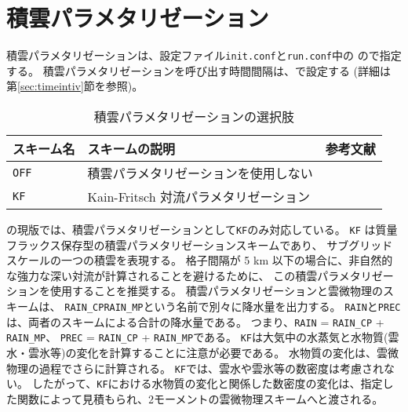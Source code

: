 \section{積雲パラメタリゼーション} \label{sec:basic_usel_cumulus}

積雲パラメタリゼーションは、設定ファイル\verb|init.conf|と\verb|run.conf|中の
ので指定する。
積雲パラメタリゼーションを呼び出す時間間隔は、で設定する
(詳細は第\ref{sec:timeintiv}節を参照)。

\begin{table}[h]
\begin{center}
  \caption{積雲パラメタリゼーションの選択肢}
  \label{tab:nml_atm_cp}
  \begin{tabularx}{150mm}{lXX} \hline
    \rowcolor[gray]{0.9}  スキーム名 & スキームの説明 & 参考文献 \\ \hline
      \verb|OFF|  & 積雲パラメタリゼーションを使用しない &  \\
      \verb|KF|   & Kain-Fritsch 対流パラメタリゼーション & \citet{kain_1990,kain_2004} \\
    \hline
  \end{tabularx}
\end{center}
\end{table}

\scalerm の現版では、積雲パラメタリゼーションとして\verb|KF|のみ対応している。
\verb|KF| は質量フラックス保存型の積雲パラメタリゼーションスキームであり、
サブグリッドスケールの一つの積雲を表現する。
格子間隔が 5 km 以下の場合に、非自然的な強力な深い対流が計算されることを避けるために、
この積雲パラメタリゼーションを使用することを推奨する。
積雲パラメタリゼーションと雲微物理のスキームは、
\verb|RAIN_CP|\verb|RAIN_MP|という名前で別々に降水量を出力する。
\verb|RAIN|と\verb|PREC|は、両者のスキームによる合計の降水量である。
つまり、\verb|RAIN| = \verb|RAIN_CP| + \verb|RAIN_MP|、
\verb|PREC| = \verb|RAIN_CP| + \verb|RAIN_MP|である。
\verb|KF|は大気中の水蒸気と水物質(雲水・雲氷等)の変化を計算することに注意が必要である。
水物質の変化は、雲微物理の過程でさらに計算される。
\verb|KF|では、雲水や雲氷等の数密度は考慮されない。
したがって、\verb|KF|における水物質の変化と関係した数密度の変化は、指定した関数によって見積もられ、2モーメントの雲微物理スキームへと渡される。

